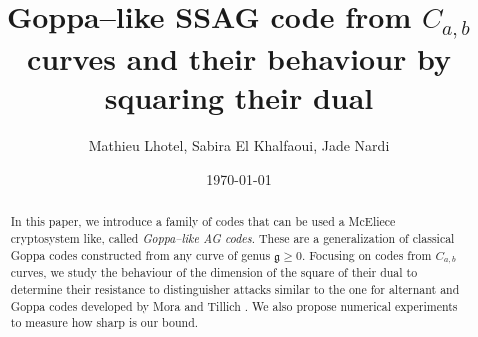 \documentclass[a4paper]{article}
\title{Goppa--like SSAG code from $C_{a,b}$ curves and their behaviour by squaring their dual}
\author{Mathieu Lhotel, Sabira El Khalfaoui, Jade Nardi}
\date{\today}
\makeatletter
\theoremstyle{definition}
\theoremstyle{remark}
\newcommand{\keywords}[1]{%
	\let\@@oldtitle\@title%
	\gdef\@title{\@@oldtitle\footnotetext{\emph{Keywords.} #1.}}%
}
\makeatother
\begin{document}
\maketitle

\begin{abstract}
In this paper, we introduce a family of codes that can be used a McEliece cryptosystem like, called \emph{Goppa--like AG codes}. These are a generalization of classical Goppa codes constructed from any curve of genus $\mathfrak{g} \geq 0$. Focusing on codes from $C_{a,b}$ curves, we study the behaviour of the dimension of the square of their dual to determine their resistance to distinguisher attacks similar to the one for alternant and Goppa codes developed by Mora and Tillich \cite{MT21}. We also propose numerical experiments to measure how sharp is our bound.
\end{abstract}
 
\keywords{AG codes, $C_{a,b}$ curves, Goppa--like AG codes, Trace codes, Schur product.}
\end{document}
